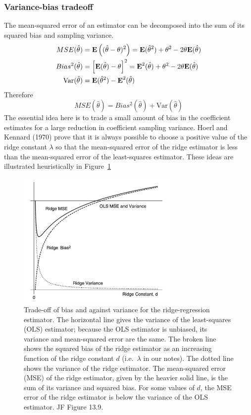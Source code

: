 \subsubsection*{Variance-bias tradeoff}
The mean-squared error of an estimator can be decomposed into the sum of its squared bias and sampling variance.
$$
\begin{aligned}
MSE(\hat{\theta}) &= {\mathbf{E}\left((\hat{\theta} - \theta)^2\right)} = \textbf{E}(\hat{\theta}^2) + \theta^2 - 2 \theta\textbf{E}(\hat{\theta}) \\
Bias^2(\hat{\theta}) &= \left[ \textbf{E}(\hat{\theta}) - \theta\right]^2 = \textbf{E}^2(\hat{\theta}) + \theta^2 - 2 \theta\textbf{E}(\hat{\theta}) \\
\text{Var}(\hat{\theta}) &= \textbf{E}(\hat{\theta}^2) - \textbf{E}^2(\hat{\theta})\\
\end{aligned}
$$
Therefore
$$
MSE(\hat{\theta}) = Bias^2(\hat{\theta}) + \text{Var}(\hat{\theta})
$$
The essential idea here is to trade a small amount of bias in the coefficient estimates for a large reduction in coefficient sampling variance.
Hoerl and Kennard (1970) prove that it is always possible to choose a positive value of the ridge constant $\lambda$ so that the mean-squared error of the ridge estimator is less than the mean-squared error of the least-squares estimator.
These ideas are illustrated heuristically in Figure~\ref{fig:13_9}
%
\begin{figure}[H]
	\begin{center}
		\includegraphics[width=0.7\textwidth]{Lecture22/JF_13_9}
		\caption{
			Trade-off of bias and against variance for the ridge-regression estimator.  
			The horizontal line gives the variance of the least-squares (OLS) estimator; because the OLS estimator is unbiased, its variance and mean-squared error are the same.
			The broken line shows the squared bias of the ridge estimator as an increasing function of the ridge constant $d$ (i.e.~$\lambda$ in our notes).
			The dotted line shows the variance of the ridge estimator.
			The mean-squared error (MSE) of the ridge estimator, given by the heavier solid line, is the sum of its variance and squared bias.
			For some values of $d$, the MSE error of the ridge estimator is below the variance of the OLS estimator.
			JF Figure 13.9.}
		\label{fig:13_9}
	\end{center}
\end{figure}
%

